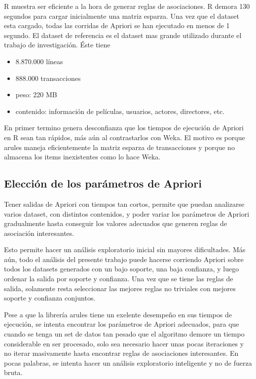 \documentclass[journal]{IEEEtran}
\begin{document}
R muestra ser eficiente a la hora de generar reglas de asociaciones. R demora 130 segundos para
cargar inicialmente una matriz esparza. Una vez que el dataset esta cargado, todas las
corridas de Apriori se han ejecutado en menos de 1 segundo. El dataset de referencia es el
dataset mas grande utilizado durante el trabajo de investigación. Éste tiene
\begin{itemize}
	\item 8.870.000 líneas
	\item 888.000 transacciones
	\item peso: 220 MB
	\item contenido: información de películas, usuarios, actores, directores, etc.
\end{itemize}

En primer termino genera desconfianza  que los tiempos de ejecución de Apriori en R 
sean tan rápidos,
más aún al contrastarlos con Weka. 
El motivo es porque arules maneja eficientemente la matriz esparza de transacciones y
porque no almacena los items inexistentes como lo hace Weka.


\subsection{Elección de los parámetros de Apriori}

Tener salidas de Apriori con tiempos tan cortos, permite que puedan analizarse 
varios dataset, con distintos contenidos, y poder variar los parámetros de Apriori gradualmente
hasta conseguir los valores adecuados que generen reglas de asociación interesantes.

Esto permite hacer un análisis exploratorio inicial sin mayores dificultades. Más aún, todo el 
análisis del presente trabajo puede hacerse corriendo Apriori sobre todos los datasets generados
con un bajo soporte, una baja confianza, y luego ordenar la salida por soporte y confianza.
Una vez que se tiene las reglas de salida, solamente resta seleccionar las mejores reglas 
no triviales con mejores soporte y confianza conjuntos.

Pese a que la librería arules tiene un exelente desempeño en sus tiempos de ejecución, se intenta
encontrar los parámetros de Apriori adecuados, para que cuando se tenga un set de datos tan pesado
que el algoritmo demore un tiempo considerable en ser procesado, 
solo sea necesario hacer unas pocas iteraciones y
no iterar masivamente hasta encontrar reglas de asociaciones interesantes. En pocas palabras,
se intenta hacer un análisis exploratorio inteligente y no de fuerza bruta.
\end{document}
